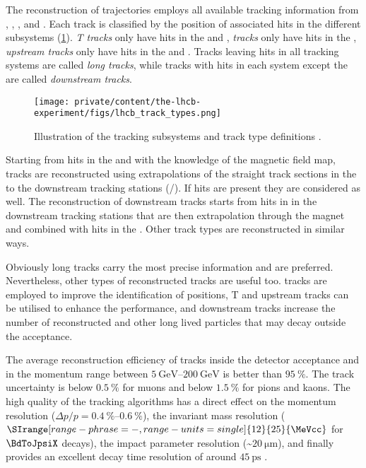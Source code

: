 The reconstruction of trajectories employs all available tracking information
from \VELO, \TT, \IT, and \OT \cite{Aaij:2014pwa}. Each track is classified by
the position of associated hits in the different subsystems
(\cref{fig:lhcb_experiment:tracking:techniques_and_performance:tracktypes}).
\emph{T tracks} only have hits in the \IT and \OT, \emph{\VELO tracks} only have
hits in the
\VELO, \emph{upstream tracks} only have hits in the \VELO and \TT. Tracks
leaving hits in all tracking systems are called \emph{long tracks}, while tracks
with hits in each system except the \VELO are called \emph{downstream tracks}.
%
\begin{figure}[t]
  \texttt{[image: private/content/the-lhcb-experiment/figs/lhcb\_track\_types.png]}
  \caption{
    Illustration of the \LHCb tracking subsystems and track type definitions \cite{Aaij:2014pwa}.
  }
  \label{fig:lhcb_experiment:tracking:techniques_and_performance:tracktypes}
\end{figure}
%
Starting from hits in the \VELO and with the knowledge of the magnetic field
map, tracks are reconstructed using extrapolations of the straight track
sections in the \VELO to the downstream tracking stations (\IT/\OT). If \TT hits
are present they are considered as well. The reconstruction of downstream tracks
starts from hits in in the downstream tracking stations that are then
extrapolation through the magnet and combined with hits in the \TT. Other track
types are reconstructed in similar ways.

Obviously long tracks carry the most precise information and are preferred.
Nevertheless, other types of reconstructed tracks are useful too. \VELO tracks
are employed to improve the identification of \PV positions, T and upstream
tracks can be utilised to enhance the \RICH performance, and downstream tracks
increase the number of reconstructed \KS and other long lived particles that may
decay outside the \VELO acceptance.

The average reconstruction efficiency of tracks inside the detector acceptance
and in the momentum range between 
$\SIrange[range-phrase = -,range-units = single]{5}{200}{\GeV}$ is better than
$\SI{95}{\percent}$. The track uncertainty is below $\SI{0.5}{\percent}$ for
muons and below $\SI{1.5}{\percent}$ for pions and kaons. The high quality of
the tracking algorithms has a direct effect on the momentum resolution ($\Delta
p/p = \SIrange[range-phrase = -,range-units = single]{0.4}{0.6}{\percent}$), the
invariant mass resolution ($\SIrange[range-phrase = -,range-units =single]{12}{25}{\MeVcc}$ 
for $\BdToJpsiX$ decays), the impact parameter resolution (\sim$\SI{20}{\micro\metre}$), 
and finally provides an excellent decay time resolution of around
$\SI{45}{\ps}$ \cite{Aaij:2014jba}.

